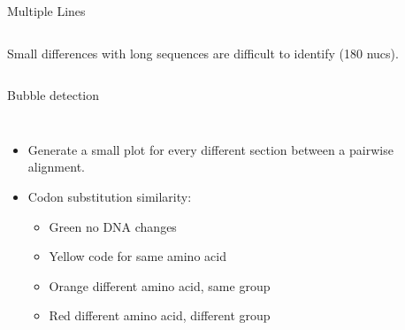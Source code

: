 \documentclass[aspectratio=169,font=14pt]{beamer}
\begin{document}
\begin{frame}[c]{Multiple Lines} %
\begin{columns}
        Small differences with long sequences are difficult to identify (180 nucs).
        \centering
        \resizebox{!}{0.9\textheight}{}
\end{columns}
\end{frame} %

\begin{frame}[t]{Bubble detection} %
\begin{columns}
    \begin{itemize}
        \setlength\itemsep{1em}
        \item Generate a small plot for every different section between a pairwise alignment.
        \item Codon substitution similarity:
        \begin{itemize}
            \setlength\itemsep{1em}
            \item Green no DNA changes
            \item Yellow code for same amino acid
            \item Orange different amino acid, same group
            \item Red different amino acid, different group
        \end{itemize}
    \end{itemize}
        \centering
        \resizebox{\textheight}{!}{}
\end{columns}
\end{frame} %
\end{document}
